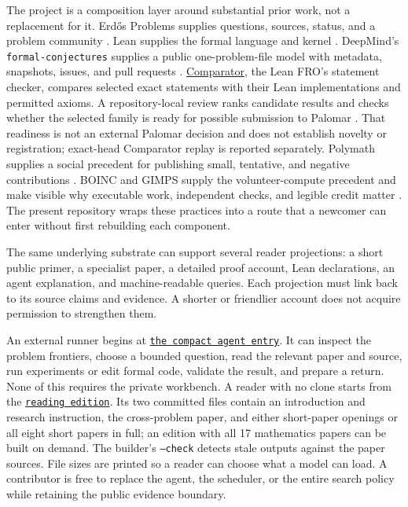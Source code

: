 \documentclass[10pt]{article}
\newcommand{\repobase}{https://github.com/wcook04/plectis-erdos}
\newcommand{\repolink}[2]{\href{\repobase/blob/402497d8e1ae025518ee34190664e8f67aa40f93/#1}{\texttt{#2}}}
\begin{document}
The project is a composition layer around substantial prior work, not a
replacement for it.  Erd\H{o}s Problems supplies questions, sources, status,
and a problem community \cite{erdosproblems}.  Lean supplies the formal
language and kernel \cite{lean4}.  DeepMind's
\texttt{formal-conjectures} supplies a public one-problem-file model with
metadata, snapshots, issues, and pull requests \cite{formalconjectures}.
\href{https://github.com/leanprover/comparator}{Comparator}, the Lean FRO's
statement checker, compares selected exact statements with their Lean
implementations and permitted axioms. A repository-local review ranks candidate results and
checks whether the selected family is ready for possible submission to
Palomar \cite{palomar}. That readiness is not an external Palomar decision and
does not establish novelty or registration; exact-head Comparator replay is
reported separately. Polymath supplies a social
precedent for publishing
small, tentative, and negative contributions \cite{polymath}.  BOINC and GIMPS
supply the volunteer-compute precedent and make visible why executable work,
independent checks, and legible credit matter \cite{boinc,gimps}.  The present
repository wraps these practices into a route that a newcomer can enter
without first rebuilding each component.

The same underlying substrate can support several reader projections: a short
public primer, a specialist paper, a detailed proof account, Lean declarations,
an agent explanation, and machine-readable queries.  Each projection must link
back to its source claims and evidence.  A shorter or friendlier account does
not acquire permission to strengthen them.

An external runner begins at \repolink{AGENTS.md}{the compact agent
entry}. It can inspect the problem frontiers, choose a bounded question, read
the relevant paper and source, run experiments or edit formal code, validate
the result, and prepare a return. None of this requires the private workbench.
A reader with no clone starts from the
\repolink{docs/reading-edition/README.md}{reading edition}. Its two committed
files contain an introduction and research instruction, the cross-problem
paper, and either short-paper openings or all eight short papers in full; an
edition with all 17 mathematics papers can be built on demand. The builder's
\texttt{--check} detects stale outputs against the paper sources. File sizes
are printed so a reader can choose what a model can load. A contributor is
free to replace the agent,
the scheduler, or the entire search policy while retaining the public evidence
boundary.
\end{document}
